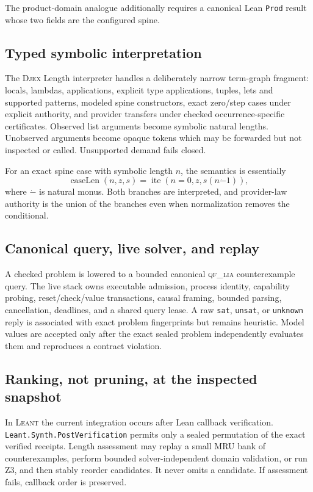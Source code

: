 \documentclass[11pt,oneside]{report}
\newcommand{\Leant}{\textsc{Leant}\xspace}
\newcommand{\Djex}{\textsc{Djex}\xspace}
\newcommand{\QFLIA}{\textsc{qf\_lia}\xspace}
\newcommand{\code}[1]{\texttt{#1}}
\begin{document}
The product-domain analogue additionally requires a canonical Lean \code{Prod} result whose two fields are the configured spine.

\subsection{Typed symbolic interpretation}

The \Djex Length interpreter handles a deliberately narrow term-graph fragment: locals, lambdas, applications, explicit type applications, tuples, lets and supported patterns, modeled spine constructors, exact zero/step cases under explicit authority, and provider transfers under checked occurrence-specific certificates. Observed list arguments become symbolic natural lengths. Unobserved arguments become opaque tokens which may be forwarded but not inspected or called. Unsupported demand fails closed.

For an exact spine case with symbolic length $n$, the semantics is essentially
\[
  \operatorname{caseLen}(n,z,s) =
  \operatorname{ite}(n=0,z,s(n \mathbin{\dot{-}} 1)),
\]
where $\dot{-}$ is natural monus. Both branches are interpreted, and provider-law authority is the union of the branches even when normalization removes the conditional.

\subsection{Canonical query, live solver, and replay}

A checked problem is lowered to a bounded canonical \QFLIA counterexample query. The live stack owns executable admission, process identity, capability probing, reset/check/value transactions, causal framing, bounded parsing, cancellation, deadlines, and a shared query lease. A raw \texttt{sat}, \texttt{unsat}, or \texttt{unknown} reply is associated with exact problem fingerprints but remains heuristic. Model values are accepted only after the exact sealed problem independently evaluates them and reproduces a contract violation.

\subsection{Ranking, not pruning, at the inspected snapshot}

In \Leant the current integration occurs after Lean callback verification. \code{Leant.Synth.PostVerification} permits only a sealed permutation of the exact verified receipts. Length assessment may replay a small MRU bank of counterexamples, perform bounded solver-independent domain validation, or run Z3, and then stably reorder candidates. It never omits a candidate. If assessment fails, callback order is preserved.
\end{document}
